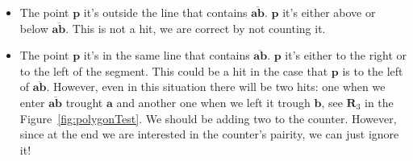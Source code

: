 \begin{itemize}
  \item The point $\mathbf{p}$ it's outside the line that contains $\overline{\mathbf{a}\mathbf{b}}$.
  $\mathbf{p}$ it's either above or below $\overline{\mathbf{a}\mathbf{b}}$.
  This is not a hit, we are correct by not counting it.
  \item The point $\mathbf{p}$ it's in the same line that contains $\overline{\mathbf{a}\mathbf{b}}$.
  $\mathbf{p}$ it's either to the right or to the left of the segment.
  This could be a hit in the case that $\mathbf{p}$ is to the left of $\overline{\mathbf{a}\mathbf{b}}$.
  However, even in this situation there will be two hits: one when we enter $\overline{\mathbf{a}\mathbf{b}}$ trought $\mathbf{a}$ and another one when we left it trough $\mathbf{b}$, see $\mathbf{R}_3$ in the Figure~\ref{fig:polygonTest}.
  We should be adding two to the counter.
  However, since at the end we are interested in the counter's pairity, we can just ignore it!
\end{itemize}

